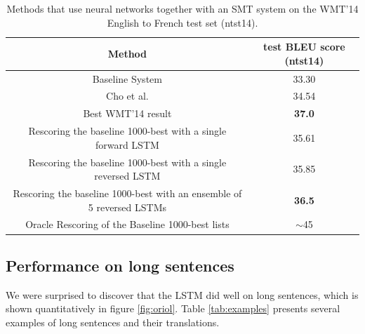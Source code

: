 \begin{table}[]
\centering
\begin{small}
\begin{tabular}{|c|c|}
\hline
{\bf Method}  & {\bf test BLEU score (ntst14) } \\ \hline
Baseline System  \cite{wmt14_en_fr} & 33.30 \\ \hline
Cho et al. \cite{cho14}  & 34.54 \\ \hline 
Best WMT'14 result \cite{durrani-EtAl:2014:W14-33} &  {\bf 37.0} \\ \hline
\hline
Rescoring the baseline 1000-best with a single forward LSTM & 35.61 \\ \hline 
Rescoring the baseline 1000-best with a single reversed  LSTM & 35.85 \\ \hline  %
Rescoring the baseline 1000-best with an ensemble of 5 reversed LSTMs  &  {\bf 36.5} \\ \hline    %
\hline
Oracle Rescoring of the Baseline 1000-best lists    & $\sim$45 \\ \hline 
\end{tabular}
\end{small}
\caption{Methods that use neural networks together with an SMT system
  on the WMT'14 English to French test set (ntst14).}
\label{tab:blue_fr_rescore}
\end{table}



\subsection{Performance on long sentences}
\label{sec:long_sentences}

We were surprised to discover that the LSTM did well on long
sentences, which is shown quantitatively in figure \ref{fig:oriol}.
Table \ref{tab:examples} presents several examples of long sentences and
their translations. 

